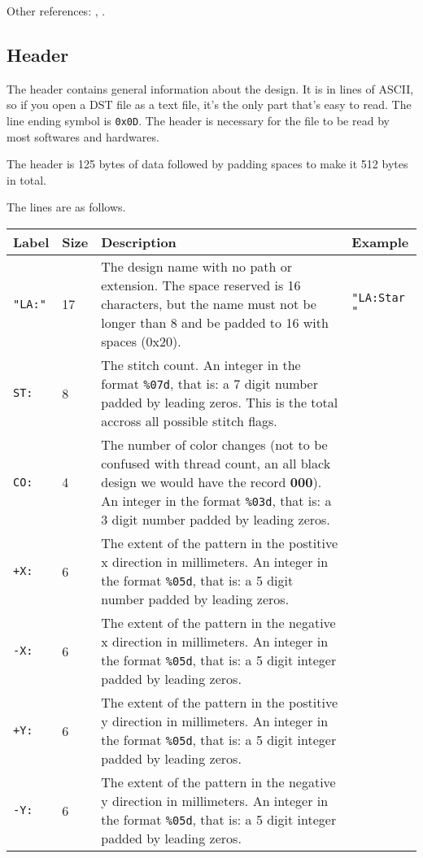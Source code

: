 Other references: \cite{kde_tajima}, \cite{acatina}.

\subsection{Header}

The header contains general information about the design. It is in lines of ASCII, so if you open a DST file as a text file, it's the only part that's easy to read. The line ending symbol is \texttt{0x0D}. The header is necessary for the file to be read by most softwares and hardwares.

The header is 125 bytes of data followed by padding spaces to make it 512 bytes in total.

The lines are as follows.

\begin{longtable}{l l p{8cm} l}
\textbf{Label} & \textbf{Size} & \textbf{Description} & \textbf{Example} \\
\hline
\texttt{"LA:"} & 17 & The design name with no path or extension. The space reserved is 16 characters, but the name must not be longer than 8 and be padded to 16 with spaces (0x20). & \texttt{"LA:Star            "} \\
\texttt{ST:} & 8 & The stitch count. An integer in the format \texttt{\%07d}, that is: a 7 digit number padded by leading zeros. This is the total accross all possible stitch flags. & \\
\texttt{CO:} & 4 & The number of color changes (not to be confused with thread count, an all black design we would have the record \textbf{000}). An integer in the format \texttt{\%03d}, that is: a 3 digit number padded by leading zeros. \\
\texttt{+X:} & 6 & The extent of the pattern in the postitive x direction in millimeters. An integer in the format \texttt{\%05d}, that is: a 5 digit number padded by leading zeros. \\
\texttt{-X:} & 6 & The extent of the pattern in the negative x direction in millimeters. An integer in the format \texttt{\%05d}, that is: a 5 digit integer padded by leading zeros. \\
\texttt{+Y:} & 6 & The extent of the pattern in the postitive y direction in millimeters. An integer in the format \texttt{\%05d}, that is: a 5 digit integer padded by leading zeros. \\
\texttt{-Y:} & 6 & The extent of the pattern in the negative y direction in millimeters. An integer in the format \texttt{\%05d}, that is: a 5 digit integer padded by leading zeros. \\

\end{longtable}
